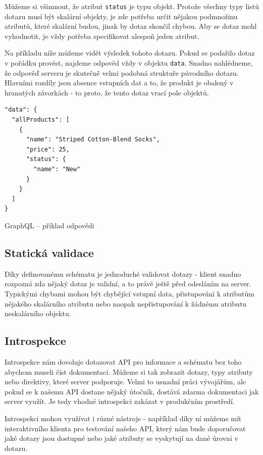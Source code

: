 \documentclass[thesis=M,czech]{FITthesis}[2019/12/23]
\begin{document}
Můžeme si všimnout, že atribut \texttt{status} je typu objekt. Protože všechny typy listů dotazu musí být skalární objekty, je zde potřeba určit nějakou podmnožinu atributů, které skalární budou, jinak by dotaz skončil chybou. Aby se dotaz mohl vyhodnotit, je vždy potřeba specifikovat alespoň jeden atribut.

Na příkladu níže můžeme vidět výsledek tohoto dotazu. Pokud se podařilo dotaz v pořádku provést, najdeme odpověd vždy v objektu \texttt{data}. Snadno nahlédneme, že odpověď serveru je skutečně velmi podobná struktuře původního dotazu. Hlavními rozdíly jsou absence vstupních dat a to, že produkt je obalený v hranatých závorkách - to proto, že tento dotaz vrací pole objektů.

\begin{listing}[H]
\begin{verbatim}
"data": {
  "allProducts": [
    {
      "name": "Striped Cotton-Blend Socks",
      "price": 25,
      "status": {
        "name": "New"
      }
    }
  ]
}
\end{verbatim}
\caption{GraphQL -- příklad odpovědi}
\label{lst:graphql_example_response}
\end{listing}

\subsection{Statická validace}
Díky definovanému schématu je jednoduché validovat dotazy - klient snadno rozpozná zda nějaký dotaz je validní, a to právě ještě před odesláním na server. Typickými chybami mohou být chybějící vstupní data, přistupování k atributům nějakého skalárního atributu nebo naopak nepřistupování k žádnému atributu neskalárního objektu.

\subsection{Introspekce}
\begin{sloppypar}
Introspekce nám dovoluje dotazovat API pro informace a schématu bez toho abychom museli číst dokumentaci. Můžeme si tak zobrazit dotazy, typy atributy nebo direktivy, které server podporuje. Velmi to usnadní práci vývojářům, ale pokud se k našemu API dostane nějaký útočník, dostává zdarma dokumentaci jak server využít. Je tedy vhodné introspekci zakázat v produkčním prostředí.
\end{sloppypar}
Introspekci mohou využívat i různé nástroje - například díky ní můžeme mít interaktivního klienta pro testování našeho API, který nám bude doporučovat jaké dotazy jsou dostupné  nebo jaké atributy se vyskytují na dané úrovni v dotazu.
\end{document}
